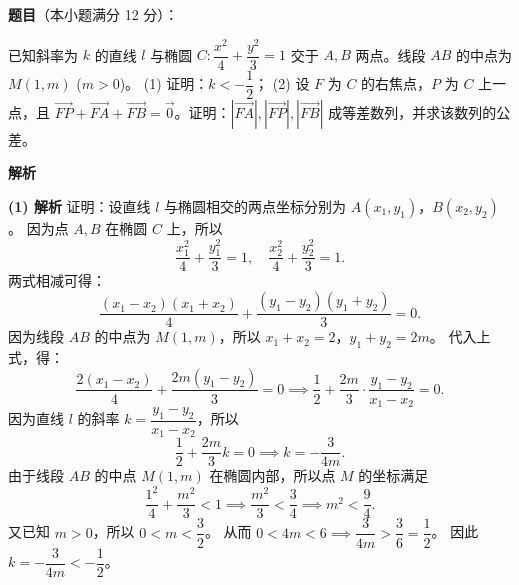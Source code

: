 \begin{answer}

\textbf{题目}（本小题满分 12 分）：

已知斜率为 $k$ 的直线 $l$ 与椭圆 $C: \dfrac{x^2}{4} + \dfrac{y^2}{3} = 1$ 交于 $A, B$ 两点。线段 $AB$ 的中点为 $M(1, m)$ ($m > 0$)。
(1) 证明：$k < -\dfrac12$；
(2) 设 $F$ 为 $C$ 的右焦点，$P$ 为 $C$ 上一点，且 $\overrightarrow{FP} + \overrightarrow{FA} + \overrightarrow{FB} = \vec 0$。证明：$|\overrightarrow{FA}|, |\overrightarrow{FP}|, |\overrightarrow{FB}|$ 成等差数列，并求该数列的公差。

\textbf{解析}

\textbf{(1) 解析} 证明：设直线 $l$ 与椭圆相交的两点坐标分别为 $A(x_1, y_1)$，$B(x_2, y_2)$。
因为点 $A, B$ 在椭圆 $C$ 上，所以
\nopagebreak[4]
\[\dfrac{x_1^2}{4} + \dfrac{y_1^2}{3} = 1, \quad \dfrac{x_2^2}{4} + \dfrac{y_2^2}{3} = 1.\]
两式相减可得：
\nopagebreak[4]
\[\dfrac{(x_1 - x_2)(x_1 + x_2)}{4} + \dfrac{(y_1 - y_2)(y_1 + y_2)}{3} = 0.\]
因为线段 $AB$ 的中点为 $M(1, m)$，所以 $x_1 + x_2 = 2$，$y_1 + y_2 = 2m$。
代入上式，得：
\nopagebreak[4]
\[\dfrac{2(x_1 - x_2)}{4} + \dfrac{2m(y_1 - y_2)}{3} = 0 \implies \dfrac12 + \dfrac{2m}{3} \cdot \dfrac{y_1 - y_2}{x_1 - x_2} = 0.\]
因为直线 $l$ 的斜率 $k = \dfrac{y_1 - y_2}{x_1 - x_2}$，所以
\nopagebreak[4]
\[\dfrac12 + \dfrac{2m}{3} k = 0 \implies k = -\dfrac{3}{4m}.\]
由于线段 $AB$ 的中点 $M(1, m)$ 在椭圆内部，所以点 $M$ 的坐标满足
\nopagebreak[4]
\[\dfrac{1^2}{4} + \dfrac{m^2}{3} < 1 \implies \dfrac{m^2}{3} < \dfrac34 \implies m^2 < \dfrac94.\]
又已知 $m > 0$，所以 $0 < m < \dfrac32$。
从而 $0 < 4m < 6 \implies \dfrac{3}{4m} > \dfrac36 = \dfrac12$。
因此 $k = -\dfrac{3}{4m} < -\dfrac12$。


\end{answer}
